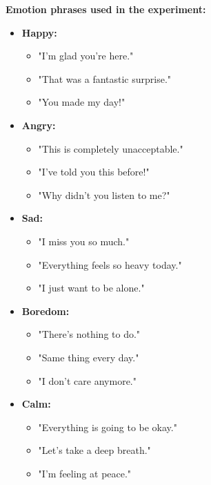 \textbf{Emotion phrases used in the experiment:}
\begin{itemize}
    \item \textbf{Happy:} 
    \begin{itemize}
        \item "I’m glad you’re here."
        \item "That was a fantastic surprise."
        \item "You made my day!"
    \end{itemize}
    \item \textbf{Angry:} 
    \begin{itemize}
        \item "This is completely unacceptable."
        \item "I’ve told you this before!"
        \item "Why didn’t you listen to me?"
    \end{itemize}
    \item \textbf{Sad:} 
    \begin{itemize}
        \item "I miss you so much."
        \item "Everything feels so heavy today."
        \item "I just want to be alone."
    \end{itemize}
    \item \textbf{Boredom:} 
    \begin{itemize}
        \item "There’s nothing to do."
        \item "Same thing every day."
        \item "I don’t care anymore."
    \end{itemize}
    \item \textbf{Calm:} 
    \begin{itemize}
        \item "Everything is going to be okay."
        \item "Let’s take a deep breath."
        \item "I’m feeling at peace."
    \end{itemize}
\end{itemize}
